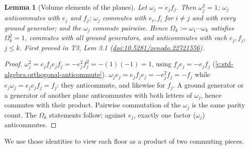 \documentclass[11pt]{article}
\newtheorem{lemma}[theorem]{Lemma}
\theoremstyle{definition}
\theoremstyle{plain}
\begin{document}
\begin{lemma}[Volume elements of the planes]\label{c:tower.volume-elements-planes}
Let $\omega_j = e_j f_j$. Then $\omega_j^2 = 1$; $\omega_j$ anticommutes with $e_j$ and $f_j$; $\omega_j$ commutes with $e_i, f_i$ for $i \neq j$ and with every ground generator; and the $\omega_j$ commute pairwise. Hence $\Omega_k := \omega_1 \cdots \omega_k$ satisfies $\Omega_k^2 = 1$, commutes with all ground generators, and anticommutes with each $e_j, f_j$, $j \leq k$.
\emph{First proved in} T3, Lem 3.1 (\href{https://doi.org/10.5281/zenodo.22721556}{doi:10.5281/zenodo.22721556}).
\end{lemma}
\begin{proof}
$\omega_j^2 = e_j f_j e_j f_j = -e_j^2 f_j^2 = -(1)(-1) = 1$, using $f_j e_j = -e_j f_j$ (\ref{c:std-algebra.orthogonal-anticommute}). $\omega_j e_j = e_j f_j e_j = -e_j^2 f_j = -f_j$ while $e_j \omega_j = e_j e_j f_j = f_j$: they anticommute, and likewise for $f_j$. A ground generator or a generator of another plane anticommutes with both letters of $\omega_j$, hence commutes with their product. Pairwise commutation of the $\omega_j$ is the same parity count. The $\Omega_k$ statements follow: against $e_j$, exactly one factor ($\omega_j$) anticommutes.

\end{proof}

We use those identities to view each floor as a product of two commuting pieces.
\end{document}
